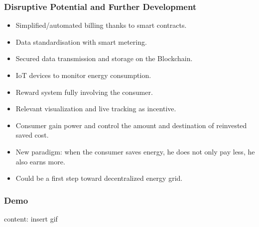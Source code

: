 \documentclass[t]{beamer}
\begin{document}
  \begin{frame}[t]
    \frametitle{Disruptive Potential and Further Development}
    \begin{itemize}
    	\item{Simplified/automated billing thanks to smart contracts.}
    	\item{Data standardisation with smart metering.}
    	\item{Secured data transmission and storage on the Blockchain.}
    	\item{IoT devices to monitor energy consumption.}
		\item{Reward system fully involving the consumer.}    
		\item{Relevant visualization and live tracking as incentive.}
		\item{Consumer gain power and control the amount and destination of reinvested saved cost.}
		\item{New paradigm: when the consumer saves energy, he does not only pay less, he also earns more.}
		\item{Could be a first step toward decentralized energy grid.}
    \end{itemize}
    \end{frame}

  \begin{frame}
    \frametitle{Demo}
    content: insert gif
  \end{frame}
\end{document}
